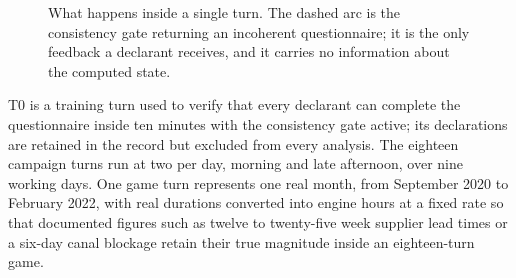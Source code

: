 \begin{figure}[htbp]
\centering
{}
\caption[One turn of the protocol]{What happens inside a single turn. The dashed arc is the
consistency gate returning an incoherent questionnaire; it is the only feedback a declarant
receives, and it carries no information about the computed state.}
\label{fig:protocol_clock}
\end{figure} T0 is a training turn used to verify that every
declarant can complete the questionnaire inside ten minutes with the consistency gate
active; its declarations are retained in the record but excluded from every analysis. The
eighteen campaign turns run at two per day, morning and late afternoon, over nine working
days. One game turn represents one real month, from September 2020 to February 2022, with
real durations converted into engine hours at a fixed rate so that documented figures such as
twelve to twenty-five week supplier lead times or a six-day canal blockage retain their true
magnitude inside an eighteen-turn game.

